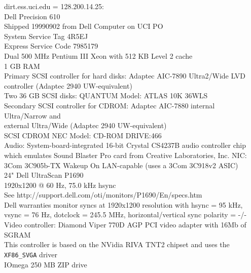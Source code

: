 \documentclass[12pt,twoside]{article}
\begin{document}
dirt.ess.uci.edu = 128.200.14.25:\\
Dell Precision 610\\
Shipped 19990902 from Dell Computer on UCI PO\\
System Service Tag 4R5EJ\\
Express Service Code 7985179\\
Dual 500 MHz Pentium III Xeon with 512 KB Level 2 cache\\
1 GB RAM\\
Primary SCSI controller for hard disks: Adaptec AIC-7890 Ultra2/Wide LVD controller (Adaptec 2940 UW-equivalent)\\
Two 36 GB SCSI disks: QUANTUM Model: ATLAS 10K 36WLS\\
Secondary SCSI controller for CDROM: Adaptec AIC-7880 internal Ultra/Narrow and\\
external Ultra/Wide (Adaptec 2940 UW-equivalent)\\
SCSI CDROM NEC Model: CD-ROM DRIVE:466\\
Audio: System-board-integrated 16-bit Crystal CS4237B audio controller
chip which emulates Sound Blaster Pro card from Creative Laboratories, Inc. 
NIC: 3Com 3C905b-TX Wakeup On LAN-capable (uses a 3Com 3C918v2 ASIC)\\
24" Dell UltraScan P1690\\
1920x1200 @ 60 Hz, 75.0 kHz hsync\\
See http://support.dell.com/oti/monitors/P1690/En/specs.htm\\
Dell warranties monitor syncs at 1920x1200 resolution with hsync = 95 kHz, vsync = 76 Hz, dotclock = 245.5 MHz, horizontal/vertical sync polarity = -/-\\
Video controller: Diamond Viper 770D AGP PCI video adapter with 16Mb of SGRAM\\
This controller is based on the NVidia RIVA TNT2 chipset and uses the \verb'XF86_SVGA' driver\\
IOmega 250 MB ZIP drive\\
\end{document}
